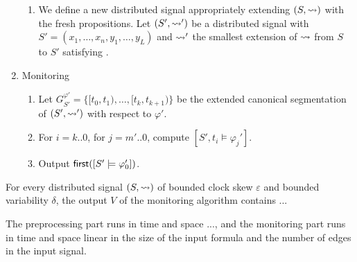 \begin{enumerate}
\begin{enumerate}[label=\arabic*.]
		\item
		We define a new distributed signal appropriately extending $(S,{\rightsquigarrow})$ with the fresh propositions.
		Let $(S', {\rightsquigarrow}')$ be a distributed signal with $S' = (x_1, \ldots, x_n, y_1, \ldots, y_L)$ and ${\rightsquigarrow}'$ the smallest extension of ${\rightsquigarrow}$ from $S$ to $S'$ satisfying . 
		
	\end{enumerate}

	\item Monitoring
	\begin{enumerate}[label=\arabic*.]
		\item
		Let $G_{S'}^{\varphi'}= \{ [t_0, t_1), \ldots, [t_k, t_{k+1}) \}$ be the extended canonical segmentation of $(S', {\rightsquigarrow}')$ with respect to $\varphi'$.
		
		\item
		For $i = k .. 0$, for $j = m' .. 0$, compute $[S', t_i \models \varphi_j']$.
		
		\item
		Output $\textsf{first}([S' \models \varphi_0'])$.
	\end{enumerate}
\end{enumerate}

\begin{claim}
	For every distributed signal $(S, {\rightsquigarrow})$ of bounded clock skew $\varepsilon$ and bounded variability $\delta$, the output $V$ of the monitoring algorithm contains ... %
\end{claim}

\begin{claim}
	The preprocessing part runs in time and space ..., and the monitoring part runs in time and space linear in the size of the input formula and the number of edges in the input signal. 
\end{claim}